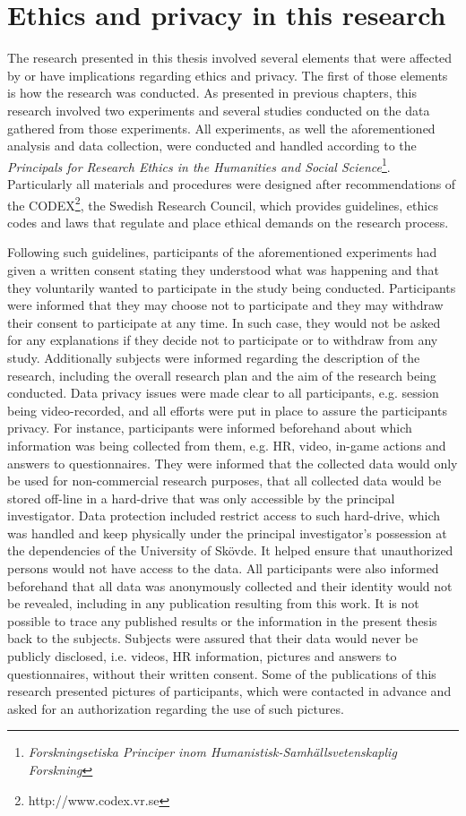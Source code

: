 \section{Ethics and privacy in this research}
\label{sec:ethics-this-research}

The research presented in this thesis involved several elements that were affected by or have implications regarding ethics and privacy. The first of those elements is how the research was conducted. As presented in previous chapters, this research involved two experiments and several studies conducted on the data gathered from those experiments. All experiments, as well the aforementioned analysis and data collection, were conducted and handled according to the \textit{Principals for Research Ethics in the Humanities and Social Science}\footnote{\textit{Forskningsetiska Principer inom Humanistisk-Samhällsvetenskaplig Forskning}}. Particularly all materials and procedures were designed after recommendations of the CODEX\footnote{http://www.codex.vr.se}, the Swedish Research Council, which provides guidelines, ethics codes and laws that regulate and place ethical demands on the research process.

Following such guidelines, participants of the aforementioned experiments had given a written consent stating they understood what was happening and that they voluntarily wanted to participate in the study being conducted. Participants were informed that they may choose not to participate and they may withdraw their consent to participate at any time. In such case, they would not be asked for any explanations if they decide not to participate or to withdraw from any study. Additionally subjects were informed regarding the description of the research, including the overall research plan and the aim of the research being conducted. Data privacy issues were made clear to all participants, e.g. session being video-recorded, and all efforts were put in place to assure the participants privacy. For instance, participants were informed beforehand about which information was being collected from them, e.g. HR, video, in-game actions and answers to questionnaires. They were informed that the collected data would only be used for non-commercial research purposes, that all collected data would be stored off-line in a hard-drive that was only accessible by the principal investigator. Data protection included restrict access to such hard-drive, which was handled and keep physically under the principal investigator's possession at the dependencies of the University of Sk\"ovde. It helped ensure that unauthorized persons would not have access to the data. All participants were also informed beforehand that all data was anonymously collected and their identity would not be revealed, including in any publication resulting from this work. It is not possible to trace any published results or the information in the present thesis back to the subjects. Subjects were assured that their data would never be publicly disclosed, i.e. videos, HR information, pictures and answers to questionnaires, without their written consent. Some of the publications of this research presented pictures of participants, which were contacted in advance and asked for an authorization regarding the use of such pictures.

